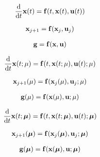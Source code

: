 \documentclass[12 pt]{article}
\begin{document}

\begin{align*}
    \frac{\textrm{d}}{\textrm{d}t}\mathbf{x}(t)
    = \mathbf{f}(t,\mathbf{x}(t),\mathbf{u}(t))
\end{align*}

\begin{align*}
    \mathbf{x}_{j+1}
    = \mathbf{f}(\mathbf{x}_{j},\mathbf{u}_{j})
\end{align*}

\begin{align*}
    \mathbf{g}
    = \mathbf{f}(\mathbf{x},\mathbf{u})
\end{align*}

\begin{align*}
    \frac{\textrm{d}}{\textrm{d}t}\mathbf{x}(t;\mu)
    = \mathbf{f}(t,\mathbf{x}(t;\mu),\mathbf{u}(t);\mu)
\end{align*}

\begin{align*}
    \mathbf{x}_{j+1}(\mu)
    = \mathbf{f}(\mathbf{x}_{j}(\mu),\mathbf{u}_{j};\mu)
\end{align*}

\begin{align*}
    \mathbf{g}(\mu)
    = \mathbf{f}(\mathbf{x}(\mu),\mathbf{u};\mu)
\end{align*}

\begin{align*}
    \frac{\textrm{d}}{\textrm{d}t}\mathbf{x}(t;\boldsymbol{\mu})
    = \mathbf{f}(t,\mathbf{x}(t;\boldsymbol{\mu}),\mathbf{u}(t);\boldsymbol{\mu})
\end{align*}

\begin{align*}
    \mathbf{x}_{j+1}(\boldsymbol{\mu})
    = \mathbf{f}(\mathbf{x}_{j}(\boldsymbol{\mu}),\mathbf{u}_{j};\boldsymbol{\mu})
\end{align*}

\begin{align*}
    \mathbf{g}(\boldsymbol{\mu})
    = \mathbf{f}(\mathbf{x}(\boldsymbol{\mu}),\mathbf{u};\boldsymbol{\mu})
\end{align*}
\end{document}
